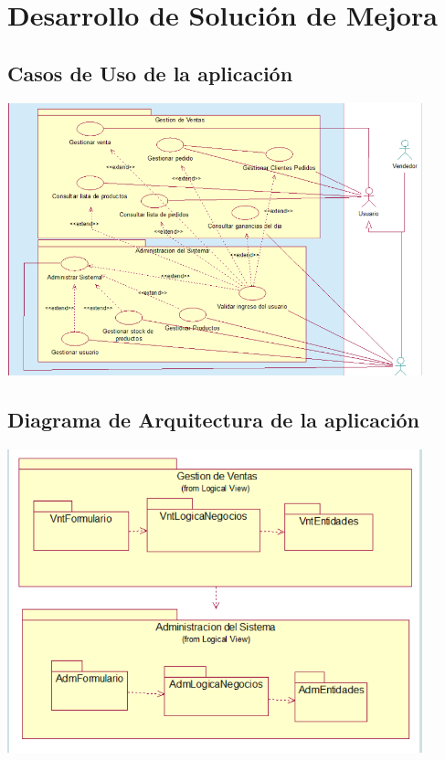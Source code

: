 \documentclass[preprint,12pt]{elsarticle}
\begin{document}
\section{Desarrollo de Solución de Mejora}
\subsection{\textbf{ Casos de Uso de la aplicación}}
\begin{center}
	\includegraphics[width=12cm]{./imagen/casouso} 
	\end{center}
\subsection{\textbf{ Diagrama de Arquitectura de la aplicación }}

	\begin{center}
	\includegraphics[width=12cm]{./imagen/vistalogica} 
	\end{center}
\end{document}
